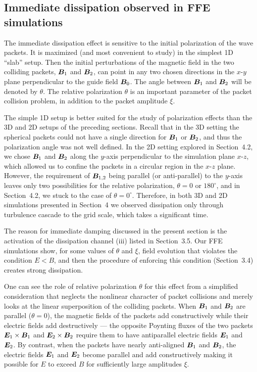 \subsection{Immediate dissipation observed in FFE simulations}
The immediate dissipation effect is sensitive to the initial polarization of the wave packets. It is maximized (and most convenient to study) in the simplest 1D ``slab'' setup. Then the initial perturbations of the magnetic field in the two colliding packets, $\boldsymbol{B}_1$ and $\boldsymbol{B}_2$, can point in any two chosen directions in the $x$-$y$ plane perpendicular to the guide field $\boldsymbol{B}_0$. The angle between $\boldsymbol{B}_1$ and $\boldsymbol{B}_2$ will be denoted by $\theta$. The relative polarization $\theta$ is an important parameter of the packet collision problem, in addition to the packet amplitude $\xi$.

The simple 1D setup is better suited for the study of polarization effects than the 3D and 2D setups of the preceding sections. Recall that in the 3D setting the spherical packets could not have a single direction for $\boldsymbol{B}_1$ or $\boldsymbol{B}_2$, and thus the polarization angle was not well defined. In the 2D setting explored in Section~4.2, we chose $\boldsymbol{B}_1$ and $\boldsymbol{B}_2$ along the $y$-axis perpendicular to the simulation plane $x$-$z$, which allowed us to confine the packets in a circular region in the $x$-$z$ plane. However, the requirement of $\boldsymbol{B}_{1,2}$ being parallel (or anti-parallel) to the $y$-axis leaves only two possibilities for the relative polarization, $\theta=0$ or $180^\circ$, and in Section~4.2, we stuck to the case of $\theta = 0^\circ$.
Therefore, in both 3D and 2D simulations presented in Section~4 we observed dissipation only through turbulence cascade to the grid scale, which takes a significant time.

The reason for immediate damping discussed in the present section is the activation of the dissipation channel (iii) listed in Section~3.5. Our FFE simulations show, for some values of $\theta$ and $\xi$, field evolution that violates the condition $E<B$, and then the procedure of enforcing this condition (Section~3.4) creates strong dissipation.

One can see the role of relative polarization $\theta$ for this effect from a simplified consideration that neglects the nonlinear character of  packet collisions and merely looks at the linear superposition of the colliding packets. When $\boldsymbol{B}_1$ and $\boldsymbol{B}_2$ are parallel ($\theta=0$), the magnetic fields of the packets add constructively while their electric fields add destructively --- the opposite Poynting fluxes of the two packets $\boldsymbol{E}_1\times \boldsymbol{B}_1$ and $\boldsymbol{E}_2\times\boldsymbol{B}_2$ require them to have antiparallel electric fields $\boldsymbol{E}_1$ and $\boldsymbol{E}_2$. 
By contrast, when the packets have nearly anti-aligned $\boldsymbol{B}_1$ and $\boldsymbol{B}_2$, the electric fields $\boldsymbol{E}_1$ and $\boldsymbol{E}_2$ become parallel and add constructively making it possible for $E$ to exceed $B$ for sufficiently large amplitudes $\xi$.

